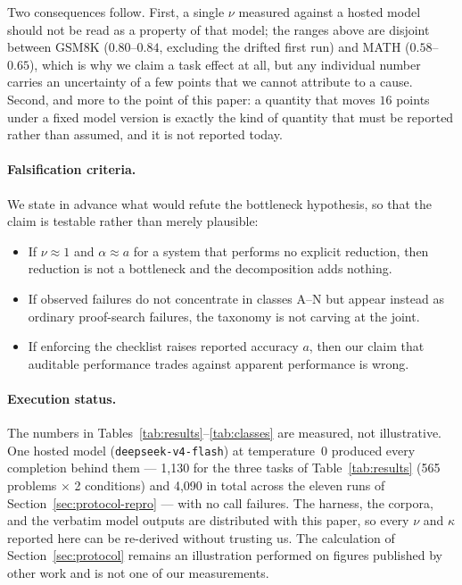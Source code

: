 \documentclass[11pt,a4paper]{article}
\begin{document}
Two consequences follow.  First, a single $\nu$ measured against a hosted model
should not be read as a property of that model; the ranges above are disjoint
between GSM8K ($0.80$--$0.84$, excluding the drifted first run) and MATH
($0.58$--$0.65$), which is why we claim a task effect at all, but any individual
number carries an uncertainty of a few points that we cannot attribute to a
cause.  Second, and more to the point of this paper: a quantity that moves
$16$ points under a fixed model version is exactly the kind of quantity that
must be reported rather than assumed, and it is not reported today.

\paragraph{Falsification criteria.}
We state in advance what would refute the bottleneck hypothesis, so that the
claim is testable rather than merely plausible:
\begin{itemize}
  \item If $\nu \approx 1$ and $\alpha \approx a$ for a system that performs no
        explicit reduction, then reduction is not a bottleneck and the
        decomposition adds nothing.
  \item If observed failures do not concentrate in classes A--N but appear
        instead as ordinary proof-search failures, the taxonomy is not carving
        at the joint.
  \item If enforcing the checklist raises reported accuracy $a$, then our claim
        that auditable performance trades against apparent performance is wrong.
\end{itemize}

\paragraph{Execution status.}
The numbers in Tables~\ref{tab:results}--\ref{tab:classes} are measured, not
illustrative.  One hosted model (\texttt{deepseek-v4-flash}) at temperature~0
produced every completion behind them --- 1,130 for the three tasks of
Table~\ref{tab:results} (565 problems $\times$ 2 conditions) and 4,090 in total
across the eleven runs of Section~\ref{sec:protocol-repro} --- with no call
failures.  The harness, the corpora, and the verbatim model outputs are
distributed with this paper, so every $\nu$ and $\kappa$ reported here can be
re-derived without trusting us.  The calculation of
Section~\ref{sec:protocol} remains an illustration performed on figures
published by other work and is not one of our measurements.
\end{document}
